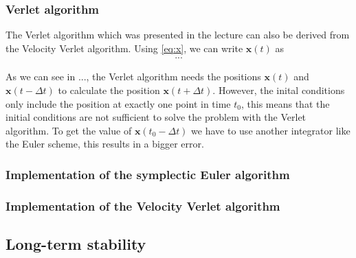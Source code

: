 \documentclass[a4paper,10pt,bibtotoc]{scrartcl}
\begin{document}
\subsubsection{Verlet algorithm}
The Verlet algorithm which was presented in the lecture can also be derived from the Velocity Verlet algorithm. Using \autoref{eq:x}, we can write $\mathbf{x}(t)$ as
\begin{align}
...
\end{align}


As we can see in ..., the Verlet algorithm needs the positions $\mathbf{x}(t)$ and $\mathbf{x}(t-\Delta t)$ to calculate the position $\mathbf{x}(t+\Delta t)$. However, the inital conditions only include the position at exactly one point in time $t_0$, this means that the initial conditions are not sufficient to solve the problem with the Verlet algorithm. To get the value of $\mathbf{x}(t_0-\Delta t)$ we have to use another integrator like the Euler scheme, this results in a bigger error.

\subsubsection{Implementation of the symplectic Euler algorithm}

\subsubsection{Implementation of the Velocity Verlet algorithm}


\subsection{Long-term stability}
\end{document}
